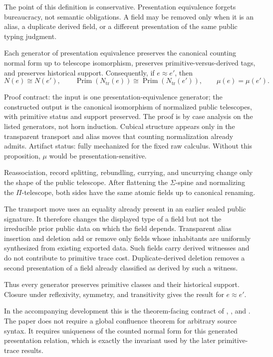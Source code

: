 \documentclass{lmcs}
\begin{document}
The point of this definition is conservative.  Presentation equivalence forgets bureaucracy,
not semantic obligations.  A field may be removed only when it is an alias, a duplicate
derived field, or a different presentation of the same public typing judgment.

\begin{prop}
Each generator of presentation equivalence preserves the canonical counting normal form up to
telescope isomorphism, preserves primitive-versus-derived tags, and preserves historical
support.  Consequently, if \(e\approx e'\), then
\[
  N(e) \cong N(e'),
  \qquad
  \operatorname{Prim}(N_{\mathrm{tr}}(e)) \cong
  \operatorname{Prim}(N_{\mathrm{tr}}(e')),
  \qquad
  \mu(e)=\mu(e').
\]

Proof contract: the input is one presentation-equivalence generator; the
constructed output is the canonical isomorphism of normalized public
telescopes, with primitive status and support preserved.  The proof is by case
analysis on the listed generators, not horn induction.  Cubical structure
appears only in the transparent transport and alias moves that counting
normalization already admits.  Artifact status: fully mechanized for the fixed
raw calculus.  Without this proposition, \(\mu\) would be presentation-sensitive.
\end{prop}

Reassociation, record splitting, rebundling, currying, and uncurrying change only the shape of
the public telescope.  After flattening the \(\Sigma\)-spine and normalizing the
\(\Pi\)-telescope, both sides have the same atomic fields up to canonical renaming.

The transport move uses an equality already present in an earlier sealed public signature.
It therefore changes the displayed type of a field but not the irreducible prior public data
on which the field depends.  Transparent alias insertion and deletion add or remove only
fields whose inhabitants are uniformly synthesized from existing exported data.  Such fields
carry derived witnesses and do not contribute to primitive trace cost.  Duplicate-derived
deletion removes a second presentation of a field already classified as derived by such a
witness.

Thus every generator preserves primitive classes and their historical support.  Closure under
reflexivity, symmetry, and transitivity gives the result for \(e\approx e'\).

In the accompanying development this is the theorem-facing contract of
,
, and
.  The paper does not require a global confluence
theorem for arbitrary source syntax.  It requires uniqueness of the counted normal form for
this generated presentation relation, which is exactly the invariant used by the later
primitive-trace results.
\end{document}
